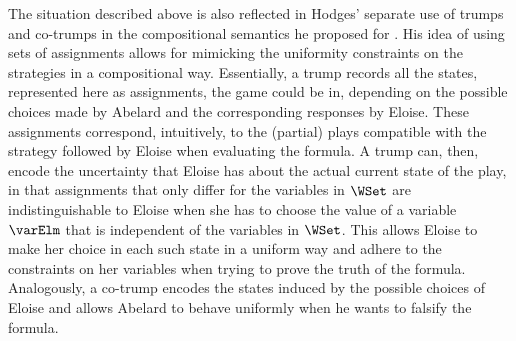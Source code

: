 \documentclass[authoryear]{elsarticle}
\begin{document}
The situation described above is also reflected in Hodges' separate use of
trumps and co-trumps in the compositional semantics he proposed for \IF.
His idea of using sets of assignments allows for mimicking the uniformity
constraints on the strategies in a compositional way.
Essentially, a trump records all the states, represented here as assignments,
the game could be in, depending on the possible choices made by Abelard and the
corresponding responses by Eloise.
These assignments correspond, intuitively, to the (partial) plays compatible
with the strategy followed by Eloise when evaluating the formula.
A trump can, then, encode the uncertainty that Eloise has about the actual
current state of the play, in that assignments that only differ for the
variables in $\WSet$ are indistinguishable to Eloise when she has to choose the
value of a variable $\varElm$ that is independent of the variables in $\WSet$.
This allows Eloise to make her choice in each such state in a uniform way and
adhere to the constraints on her variables when trying to prove the truth of the
formula.
Analogously, a co-trump encodes the states induced by the possible choices of
Eloise and allows Abelard to behave uniformly when he wants to falsify the
formula.
\end{document}
